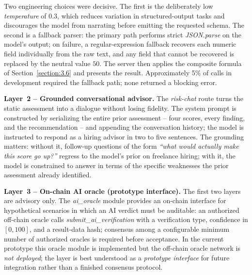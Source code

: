 Two engineering choices were decisive. The first is the deliberately low \emph{temperature} of $0.3$, which reduces variation in structured-output tasks and discourages the model from narrating before emitting the requested schema. The second is a fallback parser: the primary path performs strict \emph{JSON.parse} on the model's output; on failure, a regular-expression fallback recovers each numeric field individually from the raw text, and any field that cannot be recovered is replaced by the neutral value $50$. The server then applies the composite formula of Section~\ref{section:3.6} and presents the result. Approximately 5\% of calls in development required the fallback path; none returned a blocking error.

\textbf{Layer~2 -- Grounded conversational advisor.} The \emph{risk-chat} route turns the static assessment into a dialogue without losing fidelity. The system prompt is constructed by serializing the entire prior assessment -- four scores, every finding, and the recommendation -- and appending the conversation history; the model is instructed to respond as a hiring advisor in two to five sentences. The grounding matters: without it, follow-up questions of the form \emph{``what would actually make this score go up?''} regress to the model's prior on freelance hiring; with it, the model is constrained to answer in terms of the specific weaknesses the prior assessment already identified.

\textbf{Layer~3 -- On-chain AI oracle (prototype interface).} The first two layers are advisory only. The \emph{ai\_oracle} module provides an on-chain interface for hypothetical scenarios in which an AI verdict must be auditable: an authorized off-chain oracle calls \emph{submit\_ai\_verification} with a verification type, confidence in $[0, 100]$, and a result-data hash; consensus among a configurable minimum number of authorized oracles is required before acceptance. In the current prototype this oracle module is implemented but the off-chain oracle network is \emph{not deployed}; the layer is best understood as a \emph{prototype interface} for future integration rather than a finished consensus protocol.


